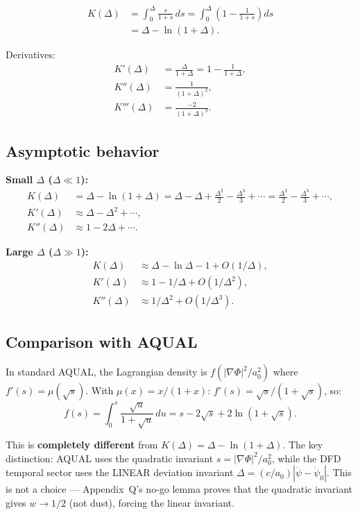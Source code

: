 \documentclass[11pt]{article}
\theoremstyle{definition}
\theoremstyle{remark}
\begin{document}
\begin{align}
K(\Delta) &= \int_0^\Delta \frac{s}{1+s}\,ds
= \int_0^\Delta \left(1 - \frac{1}{1+s}\right)ds \\
&= \Delta - \ln(1+\Delta).
\end{align}

Derivatives:
\begin{align}
K'(\Delta) &= \frac{\Delta}{1+\Delta} = 1 - \frac{1}{1+\Delta}, \\
K''(\Delta) &= \frac{1}{(1+\Delta)^2}, \\
K'''(\Delta) &= \frac{-2}{(1+\Delta)^3}.
\end{align}

\subsection{Asymptotic behavior}

\textbf{Small $\Delta$ ($\Delta \ll 1$):}
\begin{align}
K(\Delta) &= \Delta - \ln(1+\Delta)
= \Delta - \Delta + \frac{\Delta^2}{2} - \frac{\Delta^3}{3} + \cdots
= \frac{\Delta^2}{2} - \frac{\Delta^3}{3} + \cdots, \\
K'(\Delta) &\approx \Delta - \Delta^2 + \cdots, \\
K''(\Delta) &\approx 1 - 2\Delta + \cdots.
\end{align}

\textbf{Large $\Delta$ ($\Delta \gg 1$):}
\begin{align}
K(\Delta) &\approx \Delta - \ln\Delta - 1 + O(1/\Delta), \\
K'(\Delta) &\approx 1 - 1/\Delta + O(1/\Delta^2), \\
K''(\Delta) &\approx 1/\Delta^2 + O(1/\Delta^3).
\end{align}

\subsection{Comparison with AQUAL}

In standard AQUAL, the Lagrangian density is $f(|\nabla\Phi|^2/a_0^2)$
where $f'(s) = \mu(\sqrt{s})$. With $\mu(x) = x/(1+x)$:
$f'(s) = \sqrt{s}/(1+\sqrt{s})$, so:
\begin{equation}
f(s) = \int_0^s \frac{\sqrt{u}}{1+\sqrt{u}}\,du
= s - 2\sqrt{s} + 2\ln(1+\sqrt{s}).
\end{equation}

This is \textbf{completely different} from $K(\Delta) = \Delta -
\ln(1+\Delta)$. The key distinction: AQUAL uses the quadratic invariant
$s = |\nabla\Phi|^2/a_0^2$, while the DFD temporal sector uses the
LINEAR deviation invariant $\Delta = (c/a_0)|\dot\psi - \dot\psi_0|$.
This is not a choice --- Appendix~Q's no-go lemma proves that the
quadratic invariant gives $w \to 1/2$ (not dust), forcing the linear
invariant.
\end{document}
